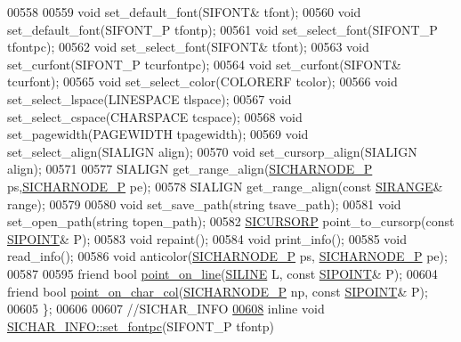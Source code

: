 \begin{DoxyCode}
00558     
00559     \textcolor{keywordtype}{void} set\_default\_font(SIFONT& tfont);   
00560     \textcolor{keywordtype}{void} set\_default\_font(SIFONT\_P tfontp); 
00561     \textcolor{keywordtype}{void} set\_select\_font(SIFONT\_P tfontpc); 
00562     \textcolor{keywordtype}{void} set\_select\_font(SIFONT& tfont);    
00563     \textcolor{keywordtype}{void} set\_curfont(SIFONT\_P tcurfontpc);  
00564     \textcolor{keywordtype}{void} set\_curfont(SIFONT& tcurfont);
00565     \textcolor{keywordtype}{void} set\_select\_color(COLORERF tcolor); 
00566     \textcolor{keywordtype}{void} set\_select\_lspace(LINESPACE tlspace);  
00567     \textcolor{keywordtype}{void} set\_select\_cspace(CHARSPACE tcspace);  
00568     \textcolor{keywordtype}{void} set\_pagewidth(PAGEWIDTH tpagewidth);   
00569     \textcolor{keywordtype}{void} set\_select\_align(SIALIGN align);   
00570     \textcolor{keywordtype}{void} set\_cursorp\_align(SIALIGN align);  
00571 
00577     SIALIGN get\_range\_align(\hyperlink{class_s_i_c_h_a_r_n_o_d_e}{SICHARNODE\_P} ps,\hyperlink{class_s_i_c_h_a_r_n_o_d_e}{SICHARNODE\_P} pe);   
00578     SIALIGN get\_range\_align(\textcolor{keyword}{const} \hyperlink{struct_s_i_r_a_n_g_e}{SIRANGE}& range);   
00579 
00580     \textcolor{keywordtype}{void} set\_save\_path(\textcolor{keywordtype}{string} tsave\_path);  
00581     \textcolor{keywordtype}{void} set\_open\_path(\textcolor{keywordtype}{string} topen\_path);  
00582     \hyperlink{class_s_i_c_h_a_r_n_o_d_e}{SICURSORP} point\_to\_cursorp(\textcolor{keyword}{const} \hyperlink{struct_s_i_p_o_i_n_t}{SIPOINT}& P);   
00583     \textcolor{keywordtype}{void} repaint(); 
00584     \textcolor{keywordtype}{void} print\_info();  
00585     \textcolor{keywordtype}{void} read\_info();   
00586     \textcolor{keywordtype}{void} anticolor(\hyperlink{class_s_i_c_h_a_r_n_o_d_e}{SICHARNODE\_P} ps, \hyperlink{class_s_i_c_h_a_r_n_o_d_e}{SICHARNODE\_P} pe);   
00587 
00595     \textcolor{keyword}{friend} \textcolor{keywordtype}{bool} \hyperlink{kernal_8h_ae39165f0f00583edee6fe18ea6bdf5e3}{point\_on\_line}(\hyperlink{struct_s_i_r_a_n_g_e}{SILINE} L, \textcolor{keyword}{const} \hyperlink{struct_s_i_p_o_i_n_t}{SIPOINT}& P);
00604     \textcolor{keyword}{friend} \textcolor{keywordtype}{bool} \hyperlink{kernal_8h_a98cfecde826e07d0286c4e279554d1fa}{point\_on\_char\_col}(\hyperlink{class_s_i_c_h_a_r_n_o_d_e}{SICHARNODE\_P} np, \textcolor{keyword}{const} 
      \hyperlink{struct_s_i_p_o_i_n_t}{SIPOINT}& P);
00605 \};
00606 
00607 \textcolor{comment}{//SICHAR\_INFO}
\hyperlink{class_s_i_c_h_a_r___i_n_f_o_a7dd5af8833b1951a6e4759668d484f37}{00608} \textcolor{keyword}{inline} \textcolor{keywordtype}{void} \hyperlink{class_s_i_c_h_a_r___i_n_f_o_a7dd5af8833b1951a6e4759668d484f37}{SICHAR\_INFO::set\_fontpc}(SIFONT\_P tfontp)

\end{DoxyCode}
